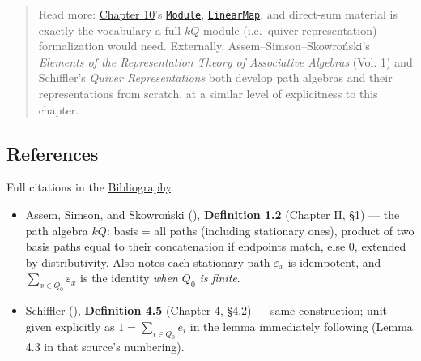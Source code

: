 \begin{quote}
Read more: \hyperref[sec:10-modules:00-index:1]{Chapter 10}'s \href{https://loogle.lean-lang.org/?q=Module}{\texttt{Module}}, \href{https://loogle.lean-lang.org/?q=LinearMap}{\texttt{LinearMap}}, and direct-sum material is exactly the vocabulary a full \(kQ\)-module (i.e.~quiver representation) formalization would need. Externally, Assem--Simson--Skowroński's \emph{Elements of the Representation Theory of Associative Algebras} (Vol. 1) and Schiffler's \emph{Quiver Representations} both develop path algebras and their representations from scratch, at a similar level of explicitness to this chapter.
\end{quote}

\subsection{References}\label{sec:11-path-algebras:05-path-composition:4}

Full citations in the \hyperref[sec:root:bibliography:1]{Bibliography}.

\begin{itemize}
\tightlist
\item
  Assem, Simson, and Skowroński (\cite{AssemSimsonSkowronski2006}), \textbf{Definition 1.2} (Chapter II, §1) --- the path algebra \(kQ\): basis = all paths (including stationary ones), product of two basis paths equal to their concatenation if endpoints match, else \(0\), extended by distributivity. Also notes each stationary path \(\varepsilon_x\) is idempotent, and \(\sum_{x\in Q_0}\varepsilon_x\) is the identity \emph{when \(Q_0\) is finite}.
\item
  Schiffler (\cite{Schiffler2014}), \textbf{Definition 4.5} (Chapter 4, §4.2) --- same construction; unit given explicitly as \(1 = \sum_{i\in Q_0} e_i\) in the lemma immediately following (Lemma 4.3 in that source's numbering).
\end{itemize}
